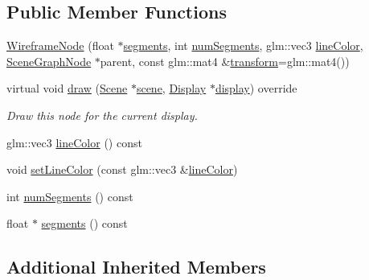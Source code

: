 \subsection*{Public Member Functions}
\begin{DoxyCompactItemize}
\item 
\hyperlink{classmotorcar_1_1WireframeNode_aa20d4f27da8395ba0d12f8fb0aa3631b}{Wireframe\-Node} (float $\ast$\hyperlink{classmotorcar_1_1WireframeNode_aedf65e6feb6cebaa7cf0e95819386a72}{segments}, int \hyperlink{classmotorcar_1_1WireframeNode_aeffe078a56d3a162de14e26a96bc474d}{num\-Segments}, glm\-::vec3 \hyperlink{classmotorcar_1_1WireframeNode_a70dd1214503a3650d6a919cb6b7c5313}{line\-Color}, \hyperlink{classmotorcar_1_1SceneGraphNode}{Scene\-Graph\-Node} $\ast$parent, const glm\-::mat4 \&\hyperlink{classmotorcar_1_1SceneGraphNode_ad96e79fdd739ac8223a3128003be391a}{transform}=glm\-::mat4())
\item 
virtual void \hyperlink{classmotorcar_1_1WireframeNode_a8be77469b6c99cfb05c2096b6d064c2e}{draw} (\hyperlink{classmotorcar_1_1Scene}{Scene} $\ast$\hyperlink{classmotorcar_1_1SceneGraphNode_aa14e637ed4ae98f77e28941a4b5cfdd8}{scene}, \hyperlink{classmotorcar_1_1Display}{Display} $\ast$\hyperlink{structdisplay}{display}) override
\begin{DoxyCompactList}\small\item\em Draw this node for the current display. \end{DoxyCompactList}\item 
glm\-::vec3 \hyperlink{classmotorcar_1_1WireframeNode_a70dd1214503a3650d6a919cb6b7c5313}{line\-Color} () const 
\item 
void \hyperlink{classmotorcar_1_1WireframeNode_a915a448da09b9cb24ecdeec38ee8a8a9}{set\-Line\-Color} (const glm\-::vec3 \&\hyperlink{classmotorcar_1_1WireframeNode_a70dd1214503a3650d6a919cb6b7c5313}{line\-Color})
\item 
int \hyperlink{classmotorcar_1_1WireframeNode_aeffe078a56d3a162de14e26a96bc474d}{num\-Segments} () const 
\item 
float $\ast$ \hyperlink{classmotorcar_1_1WireframeNode_aedf65e6feb6cebaa7cf0e95819386a72}{segments} () const 
\end{DoxyCompactItemize}
\subsection*{Additional Inherited Members}


